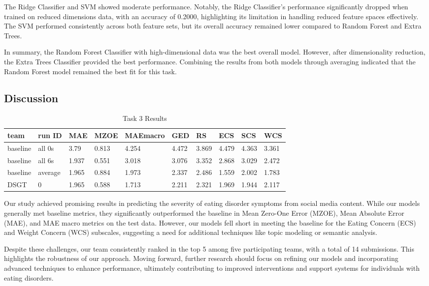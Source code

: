 \documentclass[]{style/ceurart}
\begin{document}
The Ridge Classifier and SVM showed moderate performance. Notably, the Ridge Classifier's performance significantly dropped when trained on reduced dimensions data, with an accuracy of 0.2000, highlighting its limitation in handling reduced feature spaces effectively. The SVM performed consistently across both feature sets, but its overall accuracy remained lower compared to Random Forest and Extra Trees.

In summary, the Random Forest Classifier with high-dimensional data was the best overall model. However, after dimensionality reduction, the Extra Trees Classifier provided the best performance. Combining the results from both models through averaging indicated that the Random Forest model remained the best fit for this task.

\subsection{Discussion}

\begin{table}[h]
\caption{Task 3 Results}
\begin{tabular}{llllllllll}
\toprule 
team     & run ID  & MAE   & MZOE  & MAEmacro & GED   & RS    & ECS   & SCS   & WCS   \\ \midrule
baseline & all 0s  & 3.79  & 0.813 & 4.254    & 4.472 & 3.869 & 4.479 & 4.363 & 3.361 \\
baseline & all 6s  & 1.937 & 0.551 & 3.018    & 3.076 & 3.352 & 2.868 & 3.029 & 2.472 \\
baseline & average & 1.965 & 0.884 & 1.973    & 2.337 & 2.486 & 1.559 & 2.002 & 1.783 \\ \midrule
DSGT     & 0       & 1.965 & 0.588 & 1.713    & 2.211 & 2.321 & 1.969 & 1.944 & 2.117 \\ \bottomrule
\end{tabular}
\end{table}

Our study achieved promising results in predicting the severity of eating disorder symptoms from social media content. While our models generally met baseline metrics, they significantly outperformed the baseline in Mean Zero-One Error (MZOE), Mean Absolute Error (MAE), and MAE macro metrics on the test data. However, our models fell short in meeting the baseline for the Eating Concern (ECS) and Weight Concern (WCS) subscales, suggesting a need for additional techniques like topic modeling or semantic analysis.

Despite these challenges, our team consistently ranked in the top 5 among five participating teams, with a total of 14 submissions. This highlights the robustness of our approach. Moving forward, further research should focus on refining our models and incorporating advanced techniques to enhance performance, ultimately contributing to improved interventions and support systems for individuals with eating disorders.
\end{document}
